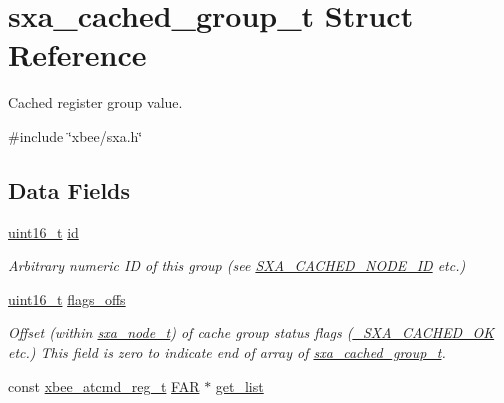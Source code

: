 \hypertarget{structsxa__cached__group__t}{}\section{sxa\+\_\+cached\+\_\+group\+\_\+t Struct Reference}
\label{structsxa__cached__group__t}


Cached register group value.  




{\ttfamily \#include \char`\"{}xbee/sxa.\+h\char`\"{}}

\subsection*{Data Fields}
\begin{DoxyCompactItemize}
\item 
\mbox{\label{structsxa__cached__group__t_a4fc3a0c58dfbd1e68224521185cb9384}} 
\hyperlink{group__hal__dos_ga5a8b2dc9e45a9ee81a94ef304fb62505}{uint16\+\_\+t} \hyperlink{structsxa__cached__group__t_a4fc3a0c58dfbd1e68224521185cb9384}{id}
\begin{DoxyCompactList}\small\item\em Arbitrary numeric ID of this group (see \hyperlink{group___s_x_a_ggabed82baf7f470b522273a3e37c24c600a8d6b7f78660e6b7da06d0fa99dfb6df6}{S\+X\+A\+\_\+\+C\+A\+C\+H\+E\+D\+\_\+\+N\+O\+D\+E\+\_\+\+ID} etc.) \end{DoxyCompactList}\item 
\hyperlink{group__hal__dos_ga5a8b2dc9e45a9ee81a94ef304fb62505}{uint16\+\_\+t} \hyperlink{structsxa__cached__group__t_a384f3d44ddc76275447a4027f7d7dc11}{flags\+\_\+offs}
\begin{DoxyCompactList}\small\item\em Offset (within \hyperlink{structsxa__node__t}{sxa\+\_\+node\+\_\+t}) of cache group status flags (\hyperlink{group___s_x_a_gga0411cd49bb5b71852cecd93bcbf0ca2da54498f64b3ad7c2be423d32b45deac04}{\+\_\+\+S\+X\+A\+\_\+\+C\+A\+C\+H\+E\+D\+\_\+\+OK} etc.) This field is zero to indicate end of array of \hyperlink{structsxa__cached__group__t}{sxa\+\_\+cached\+\_\+group\+\_\+t}. \end{DoxyCompactList}\item 
\mbox{\label{structsxa__cached__group__t_a74693ee122171373c13f53dd39a0997e}} 
const \hyperlink{structxbee__atcmd__reg__t}{xbee\+\_\+atcmd\+\_\+reg\+\_\+t} \hyperlink{group__hal_gaef060b3456fdcc093a7210a762d5f2ed}{F\+AR} $\ast$ \hyperlink{structsxa__cached__group__t_a74693ee122171373c13f53dd39a0997e}{get\+\_\+list}

\end{DoxyCompactItemize}
